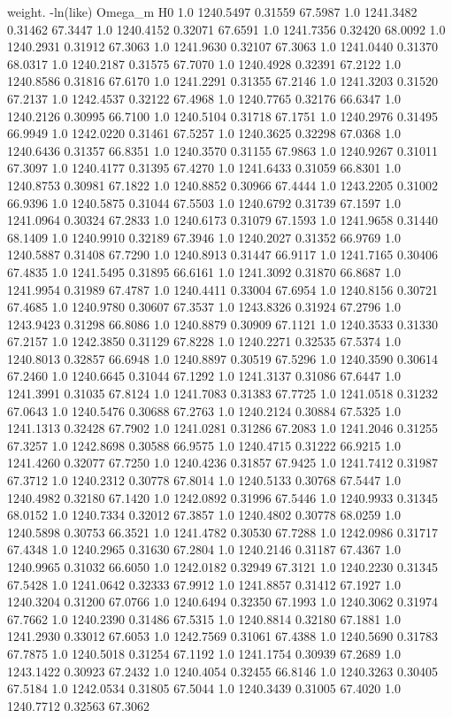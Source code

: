 weight. -ln(like)  Omega_m  H0
1.0  1240.5497  0.31559  67.5987
1.0  1241.3482  0.31462  67.3447
1.0  1240.4152  0.32071  67.6591
1.0  1241.7356  0.32420  68.0092
1.0  1240.2931  0.31912  67.3063
1.0  1241.9630  0.32107  67.3063
1.0  1241.0440  0.31370  68.0317
1.0  1240.2187  0.31575  67.7070
1.0  1240.4928  0.32391  67.2122
1.0  1240.8586  0.31816  67.6170
1.0  1241.2291  0.31355  67.2146
1.0  1241.3203  0.31520  67.2137
1.0  1242.4537  0.32122  67.4968
1.0  1240.7765  0.32176  66.6347
1.0  1240.2126  0.30995  66.7100
1.0  1240.5104  0.31718  67.1751
1.0  1240.2976  0.31495  66.9949
1.0  1242.0220  0.31461  67.5257
1.0  1240.3625  0.32298  67.0368
1.0  1240.6436  0.31357  66.8351
1.0  1240.3570  0.31155  67.9863
1.0  1240.9267  0.31011  67.3097
1.0  1240.4177  0.31395  67.4270
1.0  1241.6433  0.31059  66.8301
1.0  1240.8753  0.30981  67.1822
1.0  1240.8852  0.30966  67.4444
1.0  1243.2205  0.31002  66.9396
1.0  1240.5875  0.31044  67.5503
1.0  1240.6792  0.31739  67.1597
1.0  1241.0964  0.30324  67.2833
1.0  1240.6173  0.31079  67.1593
1.0  1241.9658  0.31440  68.1409
1.0  1240.9910  0.32189  67.3946
1.0  1240.2027  0.31352  66.9769
1.0  1240.5887  0.31408  67.7290
1.0  1240.8913  0.31447  66.9117
1.0  1241.7165  0.30406  67.4835
1.0  1241.5495  0.31895  66.6161
1.0  1241.3092  0.31870  66.8687
1.0  1241.9954  0.31989  67.4787
1.0  1240.4411  0.33004  67.6954
1.0  1240.8156  0.30721  67.4685
1.0  1240.9780  0.30607  67.3537
1.0  1243.8326  0.31924  67.2796
1.0  1243.9423  0.31298  66.8086
1.0  1240.8879  0.30909  67.1121
1.0  1240.3533  0.31330  67.2157
1.0  1242.3850  0.31129  67.8228
1.0  1240.2271  0.32535  67.5374
1.0  1240.8013  0.32857  66.6948
1.0  1240.8897  0.30519  67.5296
1.0  1240.3590  0.30614  67.2460
1.0  1240.6645  0.31044  67.1292
1.0  1241.3137  0.31086  67.6447
1.0  1241.3991  0.31035  67.8124
1.0  1241.7083  0.31383  67.7725
1.0  1241.0518  0.31232  67.0643
1.0  1240.5476  0.30688  67.2763
1.0  1240.2124  0.30884  67.5325
1.0  1241.1313  0.32428  67.7902
1.0  1241.0281  0.31286  67.2083
1.0  1241.2046  0.31255  67.3257
1.0  1242.8698  0.30588  66.9575
1.0  1240.4715  0.31222  66.9215
1.0  1241.4260  0.32077  67.7250
1.0  1240.4236  0.31857  67.9425
1.0  1241.7412  0.31987  67.3712
1.0  1240.2312  0.30778  67.8014
1.0  1240.5133  0.30768  67.5447
1.0  1240.4982  0.32180  67.1420
1.0  1242.0892  0.31996  67.5446
1.0  1240.9933  0.31345  68.0152
1.0  1240.7334  0.32012  67.3857
1.0  1240.4802  0.30778  68.0259
1.0  1240.5898  0.30753  66.3521
1.0  1241.4782  0.30530  67.7288
1.0  1242.0986  0.31717  67.4348
1.0  1240.2965  0.31630  67.2804
1.0  1240.2146  0.31187  67.4367
1.0  1240.9965  0.31032  66.6050
1.0  1242.0182  0.32949  67.3121
1.0  1240.2230  0.31345  67.5428
1.0  1241.0642  0.32333  67.9912
1.0  1241.8857  0.31412  67.1927
1.0  1240.3204  0.31200  67.0766
1.0  1240.6494  0.32350  67.1993
1.0  1240.3062  0.31974  67.7662
1.0  1240.2390  0.31486  67.5315
1.0  1240.8814  0.32180  67.1881
1.0  1241.2930  0.33012  67.6053
1.0  1242.7569  0.31061  67.4388
1.0  1240.5690  0.31783  67.7875
1.0  1240.5018  0.31254  67.1192
1.0  1241.1754  0.30939  67.2689
1.0  1243.1422  0.30923  67.2432
1.0  1240.4054  0.32455  66.8146
1.0  1240.3263  0.30405  67.5184
1.0  1242.0534  0.31805  67.5044
1.0  1240.3439  0.31005  67.4020
1.0  1240.7712  0.32563  67.3062

